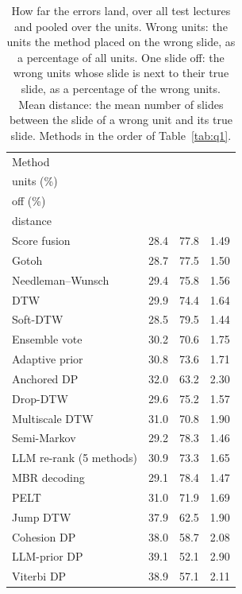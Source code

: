 \begin{table}[t]
\centering
\setlength{\tabcolsep}{1em}
\caption{How far the errors land, over all test lectures and pooled over the units. Wrong units: the units the method placed on the wrong slide, as a percentage of all units. One slide off: the wrong units whose slide is next to their true slide, as a percentage of the wrong units. Mean distance: the mean number of slides between the slide of a wrong unit and its true slide. Methods in the order of Table~\ref{tab:q1}.}
\label{tab:severity}
\begin{tabular*}{\linewidth}{@{\extracolsep{\fill}}lrrr@{}}
\toprule
Method & \begin{tabular}[b]{@{}r@{}}Wrong\\units (\%)\end{tabular} & \begin{tabular}[b]{@{}r@{}}One slide\\off (\%)\end{tabular} & \begin{tabular}[b]{@{}r@{}}Mean\\distance\end{tabular} \\
\midrule
Score fusion & 28.4 & 77.8 & 1.49 \\
Gotoh & 28.7 & 77.5 & 1.50 \\
Needleman--Wunsch & 29.4 & 75.8 & 1.56 \\
DTW & 29.9 & 74.4 & 1.64 \\
Soft-DTW & 28.5 & 79.5 & 1.44 \\
Ensemble vote & 30.2 & 70.6 & 1.75 \\
Adaptive prior & 30.8 & 73.6 & 1.71 \\
Anchored DP & 32.0 & 63.2 & 2.30 \\
Drop-DTW & 29.6 & 75.2 & 1.57 \\
Multiscale DTW & 31.0 & 70.8 & 1.90 \\
Semi-Markov & 29.2 & 78.3 & 1.46 \\
LLM re-rank (5 methods) & 30.9 & 73.3 & 1.65 \\
MBR decoding & 29.1 & 78.4 & 1.47 \\
PELT & 31.0 & 71.9 & 1.69 \\
Jump DTW & 37.9 & 62.5 & 1.90 \\
Cohesion DP & 38.0 & 58.7 & 2.08 \\
LLM-prior DP & 39.1 & 52.1 & 2.90 \\
Viterbi DP & 38.9 & 57.1 & 2.11 \\

\end{tabular*}
\end{table}
